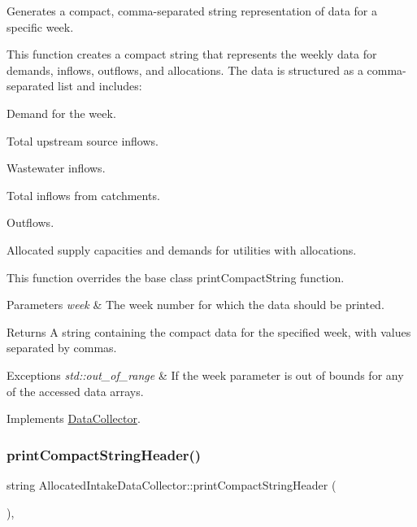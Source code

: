 Generates a compact, comma-\/separated string representation of data for a specific week. 

This function creates a compact string that represents the weekly data for demands, inflows, outflows, and allocations. The data is structured as a comma-\/separated list and includes\+:
\begin{DoxyItemize}
\item Demand for the week.
\item Total upstream source inflows.
\item Wastewater inflows.
\item Total inflows from catchments.
\item Outflows.
\item Allocated supply capacities and demands for utilities with allocations.
\end{DoxyItemize}

This function overrides the base class {\ttfamily print\+Compact\+String} function.


\begin{DoxyParams}{Parameters}
{\em week} & The week number for which the data should be printed. \\
\hline
\end{DoxyParams}
\begin{DoxyReturn}{Returns}
A string containing the compact data for the specified week, with values separated by commas.
\end{DoxyReturn}

\begin{DoxyExceptions}{Exceptions}
{\em std\+::out\+\_\+of\+\_\+range} & If the {\ttfamily week} parameter is out of bounds for any of the accessed data arrays. \\
\hline
\end{DoxyExceptions}


Implements \mbox{\hyperlink{classDataCollector_a2eac264fa5612aed5a830b12de4f4ae3}{Data\+Collector}}.

\mbox{\label{classAllocatedIntakeDataCollector_a995c69f6e2fe615786b2b26fd349c6cb}} 
\subsubsection{\texorpdfstring{print\+Compact\+String\+Header()}{printCompactStringHeader()}}
{\footnotesize\ttfamily string Allocated\+Intake\+Data\+Collector\+::print\+Compact\+String\+Header (\begin{DoxyParamCaption}{ }\end{DoxyParamCaption})\hspace{0.3cm}{\ttfamily [override]}, {\ttfamily [virtual]}}



